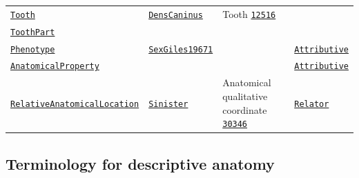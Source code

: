 \documentclass[sw]{iosart2x}
\newcommand{\anno}[1]{\href{https://annosaxfdm.de/ontology/#1}{\texttt{#1}}}
\newcommand{\gfo}[1]{\href{https://www.onto-med.de/ontologies/gfo/#1}{\texttt{#1}}}
\newcommand{\fma}[1]{\href{http://purl.org/sig/ont/fma/fma#1}{\texttt{#1}}}
\begin{document}
\begin{table}[b]
\begin{tabulary}{\textwidth}{llLl}
	\anno{Tooth}					&\anno{DensCaninus}			&Tooth \fma{12516}\\
	\anno{ToothPart}\\%
	\anno{Phenotype}				&\anno{SexGiles19671}			&											&\gfo{Attributive}\\
	\anno{AnatomicalProperty}		&						&													&\gfo{Attributive}\\
	\anno{RelativeAnatomicalLocation}&\anno{Sinister}	&Anatomical qualitative coordinate \fma{30346}	&\gfo{Relator}\\
\bottomrule
\end{tabulary}
\end{table}

\subsection{Terminology for descriptive anatomy}
\end{document}
